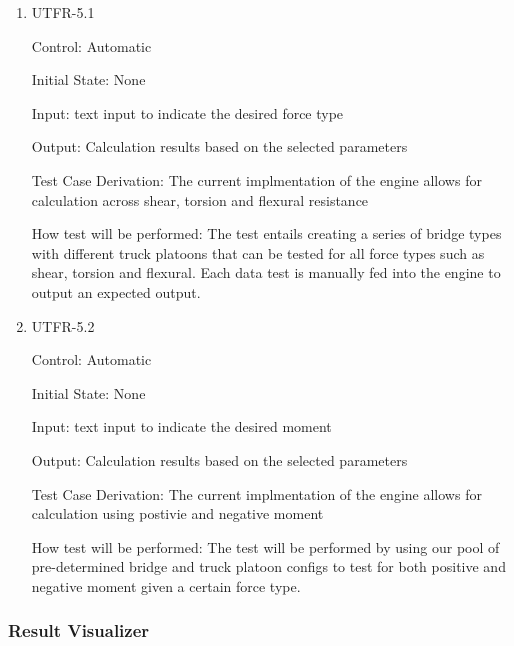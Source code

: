 \documentclass[12pt, titlepage]{article}
\begin{document}
\begin{enumerate}

\item{UTFR-5.1\\}

Control: Automatic
					
Initial State: None
					
Input: text input to indicate the desired force type  
					
Output: Calculation results based on the selected parameters 

Test Case Derivation: The current implmentation of the engine allows for calculation across shear, torsion and flexural resistance

How test will be performed: The test entails creating a series of bridge types with different truck platoons that can be tested for all force types such as shear, torsion and flexural. Each data test is manually fed into the engine to output an expected output. 
					
\item{UTFR-5.2\\}

Control: Automatic
					
Initial State: None
					
Input: text input to indicate the desired moment  
					 
Output: Calculation results based on the selected parameters 

Test Case Derivation: The current implmentation of the engine allows for calculation using postivie and negative moment 

How test will be performed: The test will be performed by using our pool of pre-determined bridge and truck platoon configs to test for both positive and negative moment given a certain force type. 

\end{enumerate}

\subsubsection{Result Visualizer}
\end{document}
